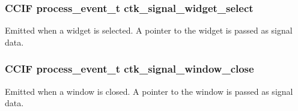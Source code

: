 \subsubsection[{ctk\+\_\+signal\+\_\+widget\+\_\+select}]{\setlength{\rightskip}{0pt plus 5cm}C\+C\+I\+F process\+\_\+event\+\_\+t ctk\+\_\+signal\+\_\+widget\+\_\+select}\label{group__ctkappfunc_ga6d9f0f4b1f9361038433a4201fa1959e}
Emitted when a widget is selected. A pointer to the widget is passed as signal data. \hypertarget{group__ctkappfunc_ga8d7e716617b14bdd39c9bc3580c9cf4f}{}
\subsubsection[{ctk\+\_\+signal\+\_\+window\+\_\+close}]{\setlength{\rightskip}{0pt plus 5cm}C\+C\+I\+F process\+\_\+event\+\_\+t ctk\+\_\+signal\+\_\+window\+\_\+close}\label{group__ctkappfunc_ga8d7e716617b14bdd39c9bc3580c9cf4f}
Emitted when a window is closed. A pointer to the window is passed as signal data. 